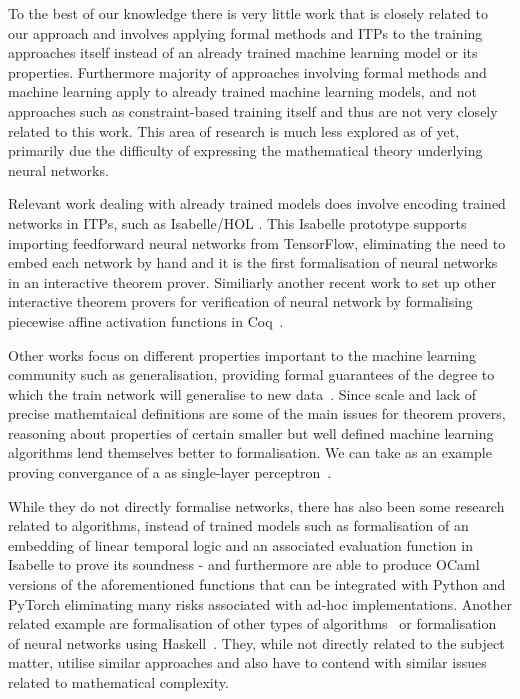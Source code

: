 \documentclass[a4paper,UKenglish,cleveref, autoref, thm-restate]{lipics-v2021}
\begin{document}
To the best of our knowledge there is very little work that is closely related to our approach and involves applying formal methods and ITPs to the training approaches itself instead of an already trained machine learning model or its properties. Furthermore majority of approaches involving formal methods and machine learning  apply to already trained machine learning models, and not approaches such as constraint-based training itself and thus are not very closely related to this work. This area of research is much less explored as of yet, primarily due the difficulty of expressing the mathematical theory underlying neural networks. 

Relevant work dealing with already trained models does involve encoding trained networks in ITPs, such as Isabelle/HOL \cite{brucker2023verifying}. This Isabelle prototype supports importing feedforward neural networks from TensorFlow, eliminating the need to embed each network by hand and it is the first formalisation of neural networks in an interactive theorem prover. Similiarly another recent work to set up other interactive theorem provers for verification of neural network by formalising piecewise affine activation functions in Coq~\cite{aleksandrov2023formalizing}. 

Other works focus on different properties important to the machine learning community such as generalisation, providing formal guarantees of the degree to which the train network will generalise to new data~\cite{bagnall2019certifying}. Since scale and lack of precise mathemtaical definitions are some of the main issues for theorem provers, reasoning about properties of certain smaller but well defined machine learning algorithms lend themselves better to formalisation. We can take as an example proving convergance of a as single-layer perceptron~\cite{murphy2017verified}.

While they do not directly formalise networks, there has also been some research related to algorithms, instead of trained models such as formalisation of an embedding of linear temporal logic and an associated evaluation function in Isabelle to prove its soundness - and furthermore are able to produce OCaml versions of the aforementioned functions that can be integrated with Python and PyTorch eliminating many risks associated with ad-hoc implementations\cite{chevallier2022constrained}. Another related example are formalisation of other types of algorithms~\cite{daukantas2021trimming} or formalisation of neural networks using Haskell~\cite{xie2023haskell}. They, while not directly related to the subject matter, utilise similar approaches and also have to contend with similar issues related to mathematical complexity.
\end{document}
